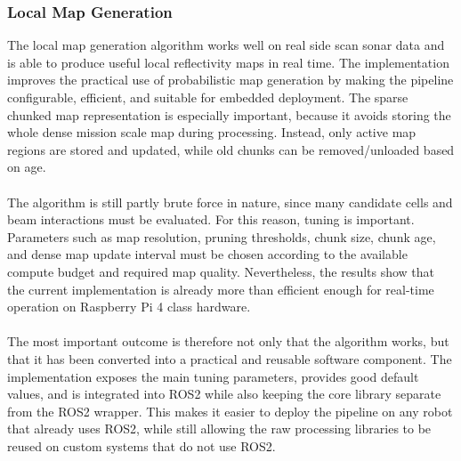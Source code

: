 \subsubsection{Local Map Generation}
The local map generation algorithm works well on real side scan sonar data and is able to produce useful local reflectivity maps in real time. The implementation improves the practical use of probabilistic map generation by making the pipeline configurable, efficient, and suitable for embedded deployment. The sparse chunked map representation is especially important, because it avoids storing the whole dense mission scale map during processing. Instead, only active map regions are stored and updated, while old chunks can be removed/unloaded based on age.
\\ \\
The algorithm is still partly brute force in nature, since many candidate cells and beam interactions must be evaluated. For this reason, tuning is important. Parameters such as map resolution, pruning thresholds, chunk size, chunk age, and dense map update interval must be chosen according to the available compute budget and required map quality. Nevertheless, the results show that the current implementation is already more than efficient enough for real-time operation on Raspberry Pi 4 class hardware.
\\ \\
The most important outcome is therefore not only that the algorithm works, but that it has been converted into a practical and reusable software component. The implementation exposes the main tuning parameters, provides good default values, and is integrated into ROS2 while also keeping the core library separate from the ROS2 wrapper. This makes it easier to deploy the pipeline on any robot that already uses ROS2, while still allowing the raw processing libraries to be reused on custom systems that do not use ROS2.

\newpage

